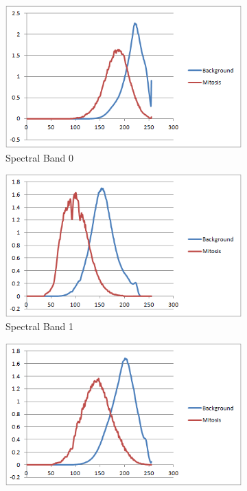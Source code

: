 \documentclass[10pt,twocolumn,letterpaper]{article}
\begin{document}
\begin{figure}[b]
	\centering
	\begin{subfigure}[b]{0.22\textwidth}
		\includegraphics[width=\textwidth]{diagrams/Band0.png}
		\caption*{Spectral Band 0}
	\end{subfigure}
	\begin{subfigure}[b]{0.22\textwidth}
		\includegraphics[width=\textwidth]{diagrams/Band1.png}
		\caption*{Spectral Band 1}
	\end{subfigure}
	\begin{subfigure}[b]{0.22\textwidth}
		\includegraphics[width=\textwidth]{diagrams/Band2.png}

\end{subfigure}
\end{figure}
\end{document}
